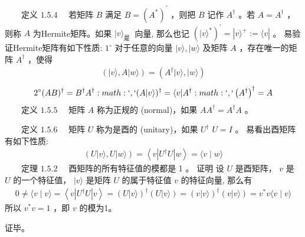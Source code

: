 \documentclass[a4paper,11pt,english]{sphinxmanual}
\begin{document}
\sphinxAtStartPar
​  定义  \(1.5.4\)   若矩阵  \(B\)  满足  \(B=\left(A^{*}\right)^{\prime}\)  ，则把  \(B\)  记作  \(A^{\dagger}\)  。若  \(A=A^{\dagger}\)  ，则称  \(A\)  为Hermite矩阵。如果  \(| {v}\rangle_{\text {是 }}\)  向量, 那么也记  \(\left(|v\rangle^{*}\right)^{\prime}=|v\rangle^{+}:=\langle v|\)  。 易验证Hermite矩阵有如下性质:  \(1^{\circ}\)  对于任意的向量  \(|v\rangle,|w\rangle\) 及矩阵 \(A\)  ，存在唯一的矩阵  \(A^{\dagger}\)  ，使得
\begin{equation*}
\begin{split}(|v\rangle, A|w\rangle)=\left(A^{\dagger}|v\rangle,|w\rangle\right)\end{split}
\end{equation*}\begin{equation*}
\begin{split}2^{\circ}(A B)^{\dagger}=B^{\dagger} A^{\dagger} :math:`,` (A|v\rangle)^{\dagger}=\langle v| A^{\dagger} :math:`,` \left(A^{\dagger}\right)^{\dagger}=A\end{split}
\end{equation*}
\sphinxAtStartPar
​  定义  \(1.5.5\)   矩阵  \(A\)  称为正规的 (normal)，如果  \(A A^{\dagger}=A^{\dagger} A\)  。

\sphinxAtStartPar
​  定义  \(1.5.6\)   矩阵  \(U\) 称为是酉的 (unitary)，如果  \(U^{\dagger}\)   \(U=I\) 。 易看出酉矩阵有如下性质:
\begin{equation*}
\begin{split}(U|v\rangle, U|w\rangle)=\left\langle v\left|U^{\dagger} U\right| w\right\rangle=\langle v \mid w\rangle\end{split}
\end{equation*}
\sphinxAtStartPar
​  定理 \(1.5.2\)  酉矩阵的所有特征值的模都是 1 。 证明 设  \(U\) 是酉矩阵，  \(v\) 是 \(U\) 的一个特征值，  \(|v \rangle\) 是矩阵 \(U\)  的属于特征值  \(v\) 的特征向量, 那么有
\begin{equation*}
\begin{split}0 \neq\langle v \mid v\rangle=\left\langle v\left|U^{\dagger} U\right| v\right\rangle=(U|v\rangle)^{\dagger}(U|v\rangle)=(v|v\rangle)^{\dagger}(v|v\rangle)=v^{*} v\langle v \mid v\rangle\end{split}
\end{equation*}
\sphinxAtStartPar
所以 \(v^*v=1\) ，即 \(v\) 的模为1。

\sphinxAtStartPar
证毕。
\end{document}
